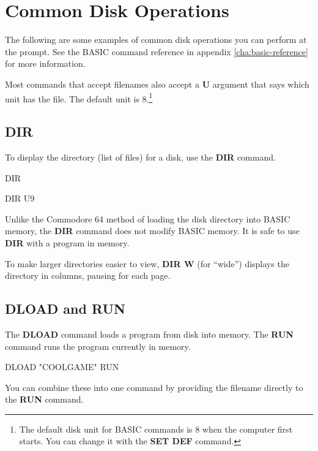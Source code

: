 \section{Common Disk Operations}

The following are some examples of common disk operations you can perform at the  prompt. See the BASIC command reference in appendix \vref{cha:basic-reference} for more information.

Most commands that accept filenames also accept a {\bf U} argument that says which unit has the file. The default unit is 8.\footnote{The default disk unit for BASIC commands is 8 when the computer first starts. You can change it with the {\bf SET DEF} command.}

\subsection{DIR}

To display the directory (list of files) for a disk, use the {\bf DIR} command.

\begin{screencode}
DIR

DIR U9
\end{screencode}

Unlike the Commodore 64 method of loading the disk directory into BASIC memory, the {\bf DIR} command does not modify BASIC memory. It is safe to use {\bf DIR} with a program in memory.

To make larger directories easier to view, {\bf DIR W} (for ``wide'') displays the directory in columns, pausing for each page.

\subsection{DLOAD and RUN}

The {\bf DLOAD} command loads a program from disk into memory. The {\bf RUN} command runs the program currently in memory.

\begin{screencode}
DLOAD "COOLGAME"
RUN
\end{screencode}

You can combine these into one command by providing the filename directly to the {\bf RUN} command.

